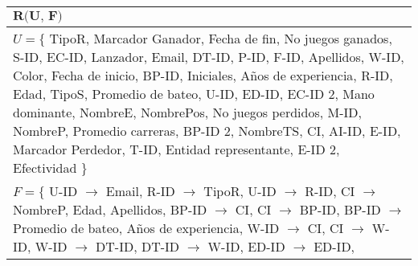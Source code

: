 \documentclass{report}
\begin{document}
    \begin{tabularx}{\textwidth}{|X|}
        \toprule
        \hfil $\textbf{R(U, F)}$ \\
        \midrule
        \vspace*{0.01cm}
        $U = \{ $ TipoR, Marcador Ganador, Fecha de fin, No juegos ganados, S-ID, EC-ID, Lanzador, Email, DT-ID, P-ID, F-ID, Apellidos, W-ID, Color, Fecha de inicio, BP-ID, Iniciales, Años de experiencia, R-ID, Edad, TipoS, Promedio de bateo, U-ID, ED-ID, EC-ID 2, Mano dominante, NombreE, NombrePos, No juegos perdidos, M-ID, NombreP, Promedio carreras, BP-ID 2, NombreTS, CI, AI-ID, E-ID, Marcador Perdedor, T-ID, Entidad representante, E-ID 2, Efectividad $\} $ 
        \vspace*{0.15cm} \\
        \midrule
        \vspace*{0.01cm}
        $F = \{$
        \hspace*{0.9cm} U-ID $\rightarrow$ Email, \newline
        \hspace*{0.9cm} R-ID $\rightarrow$ TipoR, \newline
        \hspace*{0.9cm} U-ID $\rightarrow$ R-ID, \newline
        \hspace*{0.9cm} CI $\rightarrow$ NombreP, Edad, Apellidos, \newline
        \hspace*{0.9cm} BP-ID $\rightarrow$ CI, \newline
        \hspace*{0.9cm} CI $\rightarrow$ BP-ID, \newline
        \hspace*{0.9cm} BP-ID $\rightarrow$ Promedio de bateo, Años de experiencia, \newline
        \hspace*{0.9cm} W-ID $\rightarrow$ CI, \newline
        \hspace*{0.9cm} CI $\rightarrow$ W-ID, \newline
        \hspace*{0.9cm} W-ID $\rightarrow$ DT-ID, \newline
        \hspace*{0.9cm} DT-ID $\rightarrow$ W-ID, \newline
        \hspace*{0.9cm} ED-ID $\rightarrow$ ED-ID, \newline

\end{tabularx}
\end{document}
